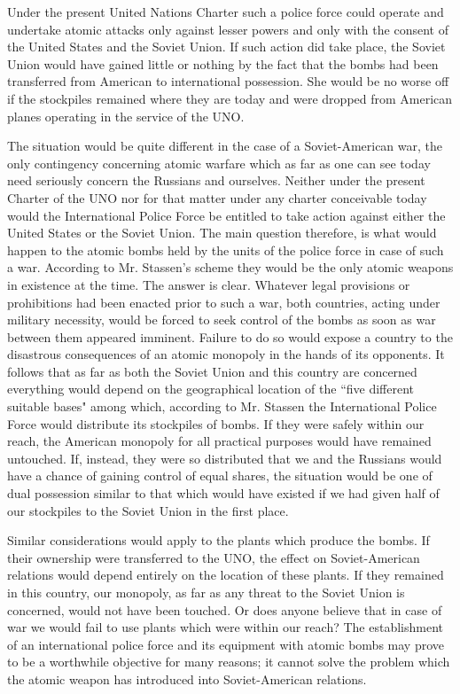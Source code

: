 Under the present United Nations Charter such a police force could operate and undertake atomic attacks only against lesser powers and only with the consent of the United States and the Soviet Union. If such action did take place, the Soviet Union would have gained little or nothing by the fact that the bombs had been transferred from American to international possession. She would be no worse off if the stockpiles remained where they are today and were dropped from American planes operating in the service of the UNO.

The situation would be quite different in the case of a Soviet-American war, the only contingency concerning atomic warfare which as far as one can see today need seriously concern the Russians and ourselves. Neither under the present Charter of the UNO nor for that matter under any charter conceivable today would the International Police Force be entitled to take action against either the United States or the Soviet Union. The main question therefore, is what would happen to the atomic bombs held by the units of the police force in case of such a war. According to Mr. Stassen's scheme they would be the only atomic weapons in existence at the time. The answer is clear. Whatever legal provisions or prohibitions had been enacted prior to such a war, both countries, acting under military necessity, would be forced to seek control of the bombs as soon as war between them appeared imminent. Failure to do so would expose a country to the disastrous consequences of an atomic monopoly in the hands of its opponents. It follows that as far as both the Soviet Union and this country are concerned everything would depend on the geographical location of the ``five different suitable bases" among which, according to Mr. Stassen the International Police Force would distribute its stockpiles of bombs. If they were safely within our reach, the American monopoly for all practical purposes would have remained untouched. If, instead, they were so distributed that we and the Russians would have a chance of gaining control of equal shares, the situation would be one of dual possession similar to that which would have existed if we had given half of our stockpiles to the Soviet Union in the first place.

Similar considerations would apply to the plants which produce the bombs. If their ownership were transferred to the UNO, the effect on Soviet-American relations would depend entirely on the location of these plants. If they remained in this country, our monopoly, as far as any threat to the Soviet Union is concerned, would not have been touched. Or does anyone believe that in case of war we would fail to use plants which were within our reach? The establishment of an international police force and its equipment with atomic bombs may prove to be a worthwhile objective for many reasons; it cannot solve the problem which the atomic weapon has introduced into Soviet-American relations.

